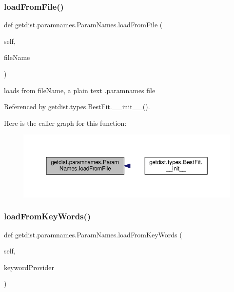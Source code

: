 \subsubsection{\texorpdfstring{load\+From\+File()}{loadFromFile()}}
{\footnotesize\ttfamily def getdist.\+paramnames.\+Param\+Names.\+load\+From\+File (\begin{DoxyParamCaption}\item[{}]{self,  }\item[{}]{file\+Name }\end{DoxyParamCaption})}

\begin{DoxyVerb}loads from fileName, a plain text .paramnames file
\end{DoxyVerb}
 

Referenced by getdist.\+types.\+Best\+Fit.\+\_\+\+\_\+init\+\_\+\+\_\+().

Here is the caller graph for this function\+:
\nopagebreak
\begin{figure}[H]
\begin{center}
\leavevmode
\includegraphics[width=350pt]{classgetdist_1_1paramnames_1_1ParamNames_a5666a4e6f847d39fcf256a099ee8d7eb_icgraph}
\end{center}
\end{figure}
\mbox{\label{classgetdist_1_1paramnames_1_1ParamNames_aca8ef6d2cece1370e86828ebfc7b84a4}} 
\subsubsection{\texorpdfstring{load\+From\+Key\+Words()}{loadFromKeyWords()}}
{\footnotesize\ttfamily def getdist.\+paramnames.\+Param\+Names.\+load\+From\+Key\+Words (\begin{DoxyParamCaption}\item[{}]{self,  }\item[{}]{keyword\+Provider }\end{DoxyParamCaption})}



